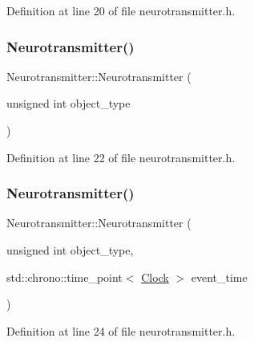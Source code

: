 Definition at line 20 of file neurotransmitter.\+h.

\mbox{\label{class_neurotransmitter_adca6f02b1a9c98d269e3909e1e2f0463}} 
\subsubsection{\texorpdfstring{Neurotransmitter()}{Neurotransmitter()}\hspace{0.1cm}{\footnotesize\ttfamily [2/4]}}
{\footnotesize\ttfamily Neurotransmitter\+::\+Neurotransmitter (\begin{DoxyParamCaption}\item[{unsigned int}]{object\+\_\+type }\end{DoxyParamCaption})\hspace{0.3cm}{\ttfamily [inline]}}



Definition at line 22 of file neurotransmitter.\+h.

\mbox{\label{class_neurotransmitter_ac1c768a2769536a8a16569ae0dde1671}} 
\subsubsection{\texorpdfstring{Neurotransmitter()}{Neurotransmitter()}\hspace{0.1cm}{\footnotesize\ttfamily [3/4]}}
{\footnotesize\ttfamily Neurotransmitter\+::\+Neurotransmitter (\begin{DoxyParamCaption}\item[{unsigned int}]{object\+\_\+type,  }\item[{std\+::chrono\+::time\+\_\+point$<$ \hyperlink{universe_8h_a0ef8d951d1ca5ab3cfaf7ab4c7a6fd80}{Clock} $>$}]{event\+\_\+time }\end{DoxyParamCaption})\hspace{0.3cm}{\ttfamily [inline]}}



Definition at line 24 of file neurotransmitter.\+h.

\mbox{\label{class_neurotransmitter_ac9257a1b310a26eba8a08ffb4b93bb64}} 
